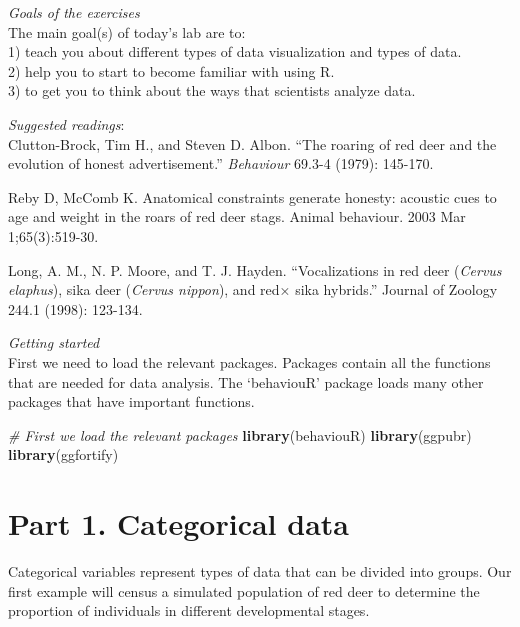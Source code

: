 \documentclass[]{book}
\newenvironment{Shaded}{\begin{snugshade}}{\end{snugshade}}
\newcommand{\CommentTok}[1]{\textcolor[rgb]{0.56,0.35,0.01}{\textit{#1}}}
\newcommand{\KeywordTok}[1]{\textcolor[rgb]{0.13,0.29,0.53}{\textbf{#1}}}
\newcommand{\NormalTok}[1]{#1}
\begin{document}
\emph{Goals of the exercises}\\
The main goal(s) of today's lab are to:\\
1) teach you about different types of data visualization and types of data.\\
2) help you to start to become familiar with using R.\\
3) to get you to think about the ways that scientists analyze data.

\emph{Suggested readings}:\\
Clutton-Brock, Tim H., and Steven D. Albon. ``The roaring of red deer and the evolution of honest advertisement.'' \emph{Behaviour} 69.3-4 (1979): 145-170.

Reby D, McComb K. Anatomical constraints generate honesty: acoustic cues to age and weight in the roars of red deer stags. Animal behaviour. 2003 Mar 1;65(3):519-30.

Long, A. M., N. P. Moore, and T. J. Hayden. ``Vocalizations in red deer (\emph{Cervus elaphus}), sika deer (\emph{Cervus nippon}), and red× sika hybrids.'' Journal of Zoology 244.1 (1998): 123-134.

\emph{Getting started}\\
First we need to load the relevant packages. Packages contain all the functions that are needed for data analysis. The `behaviouR' package loads many other packages that have important functions.

\begin{Shaded}
\begin{Highlighting}[]
\CommentTok{# First we load the relevant packages}
\KeywordTok{library}\NormalTok{(behaviouR)}
\KeywordTok{library}\NormalTok{(ggpubr)}
\KeywordTok{library}\NormalTok{(ggfortify)}
\end{Highlighting}
\end{Shaded}

\hypertarget{part-1.-categorical-data}{%
\section*{Part 1. Categorical data}\label{part-1.-categorical-data}}

Categorical variables represent types of data that can be divided into groups.
Our first example will census a simulated population of red deer to determine the proportion of individuals in different developmental stages.
\end{document}
